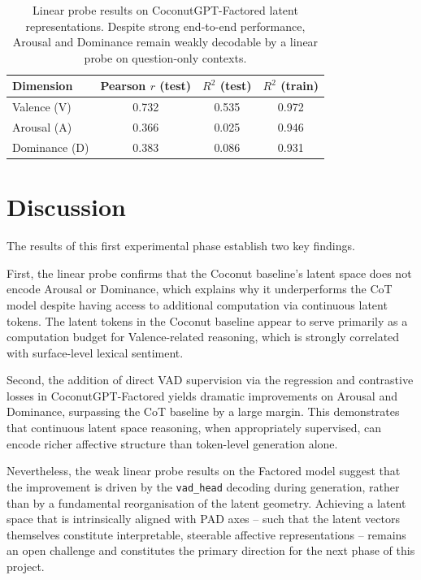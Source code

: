 \documentclass[12pt,twoside]{report}
\begin{document}
\begin{table}[H]
\centering
\begin{tabular}{lccc}
\toprule
\textbf{Dimension} & \textbf{Pearson $r$ (test)} & \textbf{$R^2$ (test)} & \textbf{$R^2$ (train)} \\
\midrule
Valence (V)   & 0.732 & 0.535 & 0.972 \\
Arousal (A)   & 0.366 & 0.025 & 0.946 \\
Dominance (D) & 0.383 & 0.086 & 0.931 \\
\bottomrule
\end{tabular}
\caption{Linear probe results on CoconutGPT-Factored latent representations. Despite strong end-to-end performance, Arousal and Dominance remain weakly decodable by a linear probe on question-only contexts.}
\label{tab:probe_factored}
\end{table}

\section{Discussion}

The results of this first experimental phase establish two key findings.

First, the linear probe confirms that the Coconut baseline's latent space does not encode Arousal or Dominance, which explains why it underperforms the CoT model despite having access to additional computation via continuous latent tokens.
The latent tokens in the Coconut baseline appear to serve primarily as a computation budget for Valence-related reasoning, which is strongly correlated with surface-level lexical sentiment.

Second, the addition of direct VAD supervision via the regression and contrastive losses in CoconutGPT-Factored yields dramatic improvements on Arousal and Dominance, surpassing the CoT baseline by a large margin.
This demonstrates that continuous latent space reasoning, when appropriately supervised, can encode richer affective structure than token-level generation alone.

Nevertheless, the weak linear probe results on the Factored model suggest that the improvement is driven by the \texttt{vad\_head} decoding during generation, rather than by a fundamental reorganisation of the latent geometry.
Achieving a latent space that is intrinsically aligned with PAD axes -- such that the latent vectors themselves constitute interpretable, steerable affective representations -- remains an open challenge and constitutes the primary direction for the next phase of this project.
\end{document}
